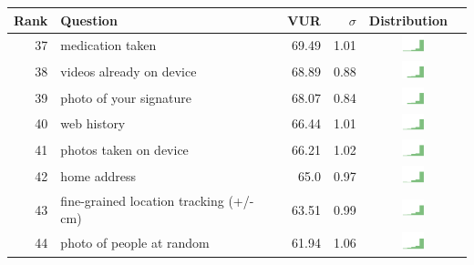\begin{table}[t]
\begin{center}
\small
\begin{tabular}{| r | l | r | r | r | r |}
\hline
Rank & Question & VUR & $\sigma$ & Distribution \\
\hline
37 & medication taken & 69.49 & 1.01 & \includegraphics[width = 2cm, height = 0.5cm]{tex-inputs/table-images/learnedwhatmedicationyoutakecombined} \\ 
38 & videos already on device & 68.89 & 0.88 & \includegraphics[width = 2cm, height = 0.5cm]{tex-inputs/table-images/sharedvideosyoutookwhicharealreadyonyourdevicecombined} \\ 
39 & photo of your signature & 68.07 & 0.84 & \includegraphics[width = 2cm, height = 0.5cm]{tex-inputs/table-images/tookapictureofyoursignaturecombined} \\ 
40 & web history & 66.44 & 1.01 & \includegraphics[width = 2cm, height = 0.5cm]{tex-inputs/table-images/learnedwhatwebsitesyougotocombined} \\ 
41 & photos taken on device & 66.21 & 1.02 & \includegraphics[width = 2cm, height = 0.5cm]{tex-inputs/table-images/sharedphotosyoutookwhicharealreadyonyourdevicecombined} \\ 
42 & home address & 65.0 & 0.97 & \includegraphics[width = 2cm, height = 0.5cm]{tex-inputs/table-images/learnedwhereyoulivesomehowcombined} \\ 
43 & fine-grained location tracking (+/- cm) & 63.51 & 0.99 & \includegraphics[width = 2cm, height = 0.5cm]{tex-inputs/table-images/trackedwhereyouareveryaccurately(whereyouareinaroom)combined} \\ 
44 & photo of people at random & 61.94 & 1.06 & \includegraphics[width = 2cm, height = 0.5cm]{tex-inputs/table-images/tookphotosofpeople(withanoutward-facingcamera)atrandomcombined} \\ 

\end{tabular}
\end{center}
\end{table}
